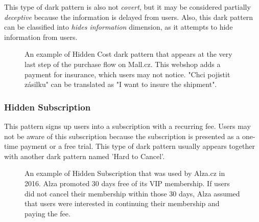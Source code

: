        This type of dark pattern is also not \emph{covert}, but it may be considered partially \emph{deceptive} because the information is delayed from users. Also, this dark pattern can be classified into \emph{hides information} dimension, as it attempts to hide information from users.
        \begin{figure}[ht]
            \centering
            \caption{An example of Hidden Cost dark pattern that appears at the very last step of the purchase flow on Mall.cz. This webshop adds a payment for insurance, which users may not notice. "Chci pojistit zásilku" can be translated as "I want to insure the shipment".}
            \label{fig:hidden-cost-mall}
        \end{figure}

        \subsubsection{Hidden Subscription}
        This pattern signs up users into a subscription with a recurring fee. Users may not be aware of this subscription because the subscription is presented as a one-time payment or a free trial. This type of dark pattern usually appears together with another dark pattern named 'Hard to Cancel'. 
        
        \begin{figure}[ht]
            \centering
            \caption{An example of Hidden Subscription that was used by Alza.cz in 2016\cite{hidden-subscription-alza-2016}. Alza promoted 30 days free of its VIP membership. If users did not cancel their membership within those 30 days, Alza assumed that users were interested in continuing their membership and paying the fee.}
            \label{fig:hidden-subscription-alza}
        \end{figure}

